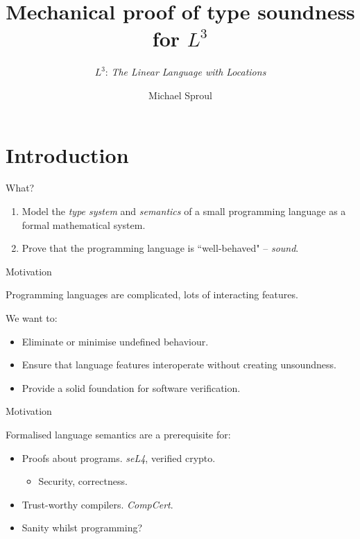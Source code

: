 \documentclass[10pt]{beamer}
\title{Mechanical proof of type soundness for $L^3$}
\subtitle{$L^3$: \textit{The Linear Language with Locations}}
\author{Michael Sproul}
\date{}
\institute{
    Supervisor: Ben Lippmeier\\
    University of New South Wales
}
\begin{document}
\maketitle

\section{Introduction}

\begin{frame}{What?}

\begin{enumerate}
\item Model the \textit{type system} and \textit{semantics} of a small programming language as a formal mathematical system.
\item Prove that the programming language is ``well-behaved" -- \textit{sound}.
\end{enumerate}
\end{frame}

\begin{frame}
{Motivation}

Programming languages are complicated, lots of interacting features.

We want to:

\begin{itemize}
\item Eliminate or minimise undefined behaviour.

\item Ensure that language features interoperate without creating unsoundness.

\item Provide a solid foundation for software verification.

\end{itemize}
\end{frame}

\begin{frame}
{Motivation}

Formalised language semantics are a prerequisite for:

\begin{itemize}
\item Proofs about programs. \textit{seL4}, verified crypto.
    \begin{itemize}
    \item Security, correctness.
    \end{itemize}
\item Trust-worthy compilers. \textit{CompCert}.
\item Sanity whilst programming?
\end{itemize}
\end{frame}
\end{document}
